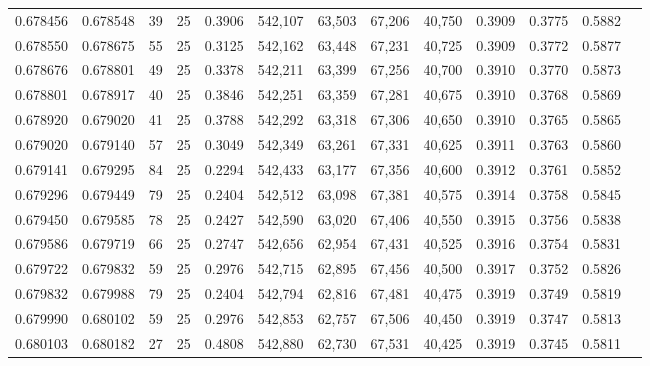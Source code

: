 \begin{tabular}{rrrrrrrrrrrrr}
0.678456 & 0.678548 &    39 &  25 &                                     0.3906 & 542,107 &  63,503 &  67,206 &  40,750 & 0.3909 & 0.3775 & 0.5882 \\
0.678550 & 0.678675 &    55 &  25 &                                     0.3125 & 542,162 &  63,448 &  67,231 &  40,725 & 0.3909 & 0.3772 & 0.5877 \\
0.678676 & 0.678801 &    49 &  25 &                                     0.3378 & 542,211 &  63,399 &  67,256 &  40,700 & 0.3910 & 0.3770 & 0.5873 \\
0.678801 & 0.678917 &    40 &  25 &                                     0.3846 & 542,251 &  63,359 &  67,281 &  40,675 & 0.3910 & 0.3768 & 0.5869 \\
0.678920 & 0.679020 &    41 &  25 &                                     0.3788 & 542,292 &  63,318 &  67,306 &  40,650 & 0.3910 & 0.3765 & 0.5865 \\
0.679020 & 0.679140 &    57 &  25 &                                     0.3049 & 542,349 &  63,261 &  67,331 &  40,625 & 0.3911 & 0.3763 & 0.5860 \\
0.679141 & 0.679295 &    84 &  25 &                                     0.2294 & 542,433 &  63,177 &  67,356 &  40,600 & 0.3912 & 0.3761 & 0.5852 \\
0.679296 & 0.679449 &    79 &  25 &                                     0.2404 & 542,512 &  63,098 &  67,381 &  40,575 & 0.3914 & 0.3758 & 0.5845 \\
0.679450 & 0.679585 &    78 &  25 &                                     0.2427 & 542,590 &  63,020 &  67,406 &  40,550 & 0.3915 & 0.3756 & 0.5838 \\
0.679586 & 0.679719 &    66 &  25 &                                     0.2747 & 542,656 &  62,954 &  67,431 &  40,525 & 0.3916 & 0.3754 & 0.5831 \\
0.679722 & 0.679832 &    59 &  25 &                                     0.2976 & 542,715 &  62,895 &  67,456 &  40,500 & 0.3917 & 0.3752 & 0.5826 \\
0.679832 & 0.679988 &    79 &  25 &                                     0.2404 & 542,794 &  62,816 &  67,481 &  40,475 & 0.3919 & 0.3749 & 0.5819 \\
0.679990 & 0.680102 &    59 &  25 &                                     0.2976 & 542,853 &  62,757 &  67,506 &  40,450 & 0.3919 & 0.3747 & 0.5813 \\
0.680103 & 0.680182 &    27 &  25 &                                     0.4808 & 542,880 &  62,730 &  67,531 &  40,425 & 0.3919 & 0.3745 & 0.5811 \\

\end{tabular}
